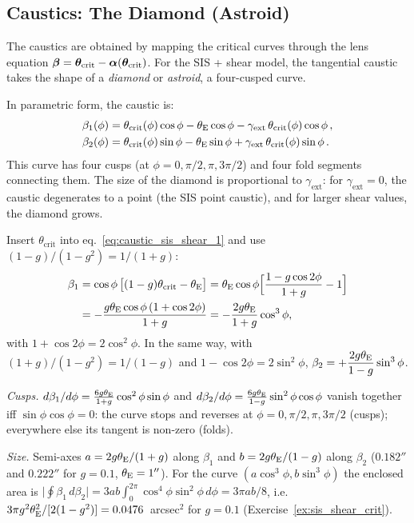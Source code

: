 \subsection{Caustics: The Diamond (Astroid)}

The caustics are obtained by mapping the critical curves through the
lens equation $\boldsymbol{\beta} = \boldsymbol{\theta}_{\mathrm{crit}} -
\boldsymbol{\alpha}(\boldsymbol{\theta}_{\mathrm{crit}})$.  For the SIS + shear model,
the tangential caustic takes the shape of a \emph{diamond} or
\emph{astroid}, a four-cusped curve.

In parametric form, the caustic is:
\begin{align}
    \beta_1(\phi) &= \theta_{\mathrm{crit}}(\phi)\cos\phi
    - \theta_{\mathrm{E}}\cos\phi - \gamma_{\mathrm{ext}}\,
    \theta_{\mathrm{crit}}(\phi)\cos\phi \,,
    \label{eq:caustic_sis_shear_1} \\
    \beta_2(\phi) &= \theta_{\mathrm{crit}}(\phi)\sin\phi
    - \theta_{\mathrm{E}}\sin\phi + \gamma_{\mathrm{ext}}\,
    \theta_{\mathrm{crit}}(\phi)\sin\phi \,.
    \label{eq:caustic_sis_shear_2}
\end{align}
This curve has four cusps (at $\phi = 0, \pi/2, \pi, 3\pi/2$) and
four fold segments connecting them.  The size of the diamond is
proportional to $\gamma_{\mathrm{ext}}$: for
$\gamma_{\mathrm{ext}} = 0$, the caustic degenerates to a point
(the SIS point caustic), and for larger shear values, the diamond
grows.

\begin{derivation}
Insert $\theta_{\mathrm{crit}}$ into eq.~\eqref{eq:caustic_sis_shear_1} and use
$(1-g)/(1-g^2) = 1/(1+g)$:
\begin{align*}
  \beta_1 &= \cos\phi\,\big[(1-g)\theta_{\mathrm{crit}} - \theta_{\mathrm{E}}\big]
  = \theta_{\mathrm{E}}\cos\phi\Big[\frac{1-g\cos2\phi}{1+g} - 1\Big]\\
  &= -\frac{g\theta_{\mathrm{E}}\cos\phi\,(1+\cos2\phi)}{1+g}
  = -\frac{2g\theta_{\mathrm{E}}}{1+g}\cos^3\phi ,
\end{align*}
with $1+\cos2\phi = 2\cos^2\phi$.  In the same way, with
$(1+g)/(1-g^2) = 1/(1-g)$ and $1-\cos2\phi = 2\sin^2\phi$,
$\beta_2 = +\dfrac{2g\theta_{\mathrm{E}}}{1-g}\sin^3\phi$.

\textit{Cusps.}  $d\beta_1/d\phi = \frac{6g\theta_{\mathrm{E}}}{1+g}\cos^2\phi\sin\phi$ and
$d\beta_2/d\phi = \frac{6g\theta_{\mathrm{E}}}{1-g}\sin^2\phi\cos\phi$ vanish together iff
$\sin\phi\cos\phi = 0$: the curve stops and reverses at
$\phi = 0, \pi/2, \pi, 3\pi/2$ (cusps); everywhere else its tangent is
non-zero (folds).

\textit{Size.}  Semi-axes $a = 2g\theta_{\mathrm{E}}/(1+g)$ along $\beta_1$ and
$b = 2g\theta_{\mathrm{E}}/(1-g)$ along $\beta_2$ ($0.182''$ and $0.222''$ for
$g = 0.1$, $\theta_{\mathrm{E}} = 1''$).  For the curve $(a\cos^3\phi, b\sin^3\phi)$ the
enclosed area is $\big|\oint\beta_1\,d\beta_2\big| = 3ab\int_0^{2\pi}\cos^4\phi
\sin^2\phi\,d\phi = 3\pi ab/8$, i.e.\
$3\pi g^2\theta_{\mathrm{E}}^2/[2(1-g^2)] = 0.0476$~arcsec$^2$ for $g = 0.1$
(Exercise~\ref{ex:sis_shear_crit}).
\end{derivation}

